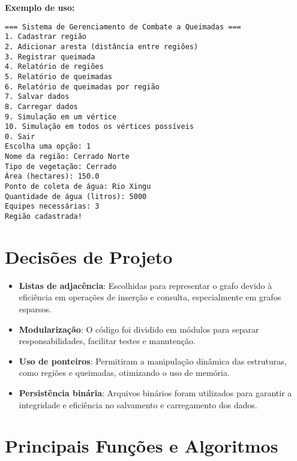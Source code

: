 \documentclass{article}
\begin{document}
\textbf{Exemplo de uso:}

\begin{verbatim}
=== Sistema de Gerenciamento de Combate a Queimadas ===
1. Cadastrar região
2. Adicionar aresta (distância entre regiões)
3. Registrar queimada
4. Relatório de regiões
5. Relatório de queimadas
6. Relatório de queimadas por região
7. Salvar dados
8. Carregar dados
9. Simulação em um vértice
10. Simulação em todos os vértices possíveis
0. Sair
Escolha uma opção: 1
Nome da região: Cerrado Norte
Tipo de vegetação: Cerrado
Área (hectares): 150.0
Ponto de coleta de água: Rio Xingu
Quantidade de água (litros): 5000
Equipes necessárias: 3
Região cadastrada!
\end{verbatim}

\section{Decisões de Projeto}

\begin{itemize}
    \item \textbf{Listas de adjacência}: Escolhidas para representar o grafo devido à eficiência em operações de inserção e consulta, especialmente em grafos esparsos.
    \item \textbf{Modularização}: O código foi dividido em módulos para separar responsabilidades, facilitar testes e manutenção.
    \item \textbf{Uso de ponteiros}: Permitiram a manipulação dinâmica das estruturas, como regiões e queimadas, otimizando o uso de memória.
    \item \textbf{Persistência binária}: Arquivos binários foram utilizados para garantir a integridade e eficiência no salvamento e carregamento dos dados.
\end{itemize}

\section{Principais Funções e Algoritmos}
\end{document}
